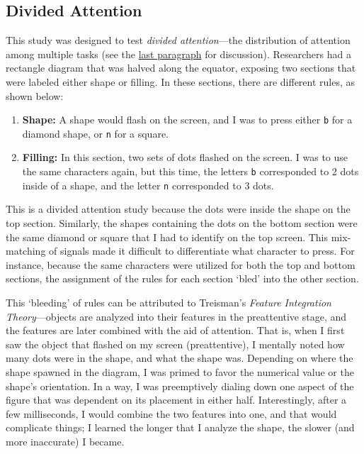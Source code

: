 \documentclass[stu,12pt,floatsintext]{apa7}
\begin{document}
\subsection{Divided Attention}

This study was designed to test \textit{divided attention}---the distribution of attention among multiple tasks (see the \hyperlink{last}{last paragraph} for discussion). Researchers had a rectangle diagram that was halved along the equator, exposing two sections that were labeled either shape or filling. In these sections, there are different rules, as shown below:
\begin{enumerate}
    \item \textbf{Shape:} A shape would flash on the screen, and I was to press either \texttt{b} for a diamond shape, or \texttt{n} for a square.
    \item \textbf{Filling:} In this section, two sets of dots flashed on the screen. I was to use the same characters again, but this time, the letters \texttt{b} corresponded to 2 dots inside of a shape, and the letter \texttt{n} corresponded to 3 dots.
\end{enumerate}

This is a divided attention study because the dots were inside the shape on the top section. Similarly, the shapes containing the dots on the bottom section were the same diamond or square that I had to identify on the top screen. This mix-matching of signals made it difficult to differentiate what character to press. For instance, because the same characters were utilized for both the top and bottom sections, the assignment of the rules for each section `bled' into the other section.

This `bleeding' of rules can be attributed to Treisman's \textit{Feature Integration Theory}---objects are analyzed into their features in the preattentive stage, and the features are later combined with the aid of attention. That is, when I first saw the object that flashed on my screen (preattentive), I mentally noted how many dots were in the shape, and what the shape was. Depending on where the shape spawned in the diagram, I was primed to favor the numerical value or the shape's orientation. In a way, I was preemptively dialing down one aspect of the figure that was dependent on its placement in either half. Interestingly, after a few milliseconds, I would combine the two features into one, and that would complicate things; I learned the longer that I analyze the shape, the slower (and more inaccurate) I became.
\end{document}
